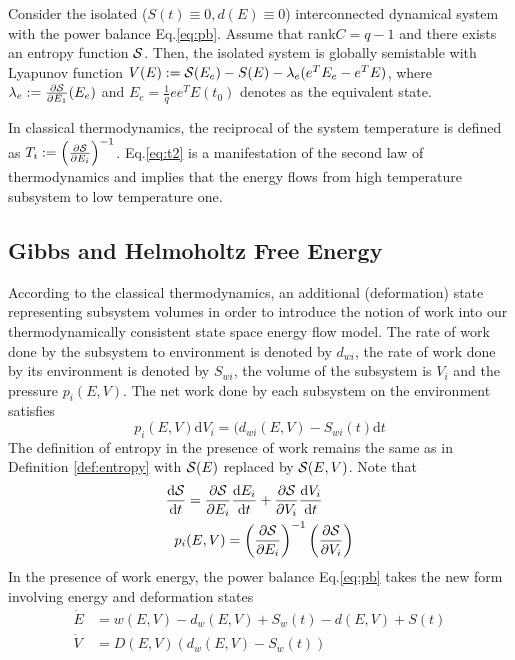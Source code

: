 \documentclass{paper}
\begin{document}
\begin{thm}
Consider the isolated ($S(t)\equiv 0, d(E)\equiv 0$) interconnected dynamical system with the power balance Eq.\ref{eq:pb}.
Assume that rank$C=q-1$ and there exists an entropy function $\mathcal{S}$. Then, the isolated system is globally semistable with
Lyapunov function $V(E):=\mathcal{S}(E_e)-S(E)-\lambda_e(e^TE_e-e^TE)$, where $\lambda_e:=\frac{\partial \mathcal{S}}{\partial E_1}(E_e)$
and $E_e=\frac{1}{q}ee^TE(t_0)$ denotes as the equivalent state.
\end{thm}
In classical thermodynamics, the reciprocal of the system temperature is defined as $T_i:=\left(\frac{\partial \mathcal{S}}
{\partial E_i}\right)^{-1}$. Eq.\ref{eq:t2} is a manifestation of the second law of thermodynamics and implies that the 
energy flows from high temperature subsystem to low temperature one.
\subsection{Gibbs and Helmoholtz Free Energy}
According to the classical thermodynamics, an additional (deformation) state representing subsystem volumes in order to
introduce the notion of work into our thermodynamically consistent state space energy flow model. The rate of work done
by the subsystem to environment is denoted by $d_{wi}$, the rate of work done by its environment is denoted by $S_{wi}$,
the volume of the subsystem is $V_i$ and the pressure $p_i(E,V)$. The net work done by each subsystem on the environment
satisfies 
\begin{equation}
p_i(E,V)\text{d}V_i=(d_{wi}(E,V)-S_{wi}(t)\text{d}t
\end{equation} 
The definition of entropy in the presence of work remains the same as in Definition \ref{def:entropy} with $\mathcal{S}(E)$ 
replaced by $\mathcal{S}(E,V)$. Note that 
\begin{align}
\frac{\text{d} \mathcal{S}}{\text{d} t}&=\frac{\partial \mathcal{S}}{\partial E_i}\frac{\text{d} E_i}{\text{d} t} +\frac{\partial \mathcal{S}}{\partial V_i}
\frac{\text{d} V_i}{\text{d} t}  \\
p_i&(E,V)=\left(\frac{\partial \mathcal{S}}{\partial E_i}\right)^{-1}\left(\frac{\partial\mathcal{S}}{\partial V_i}\right) 
\end{align}
In the presence of work energy, the power balance Eq.\ref{eq:pb} takes the new form involving energy and deformation states
\begin{eqnarray}
\dot{E}&=w(E,V)-d_w(E,V)+S_w(t)-d(E,V)+S(t) \label{eq:e1} \\ 
\dot{V}&=D(E,V)(d_w(E,V)-S_w(t)) \label{eq:v1}
\end{eqnarray}
\end{document}
